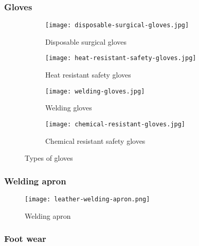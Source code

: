 \documentclass[a4paper,12pt]{article}
\begin{document}
					\subsubsection*{Gloves}
						\begin{figure}[H]
							\begin{subfigure}{.5\textwidth}	
								\centering								
								\texttt{[image: disposable-surgical-gloves.jpg]}
							\caption{Disposable surgical gloves}
							\label{subfig:disposable-surgical-gloves}
							\end{subfigure}
							\hfill
							\begin{subfigure}{.5\textwidth}
								\centering		
								\texttt{[image: heat-resistant-safety-gloves.jpg]}
							\caption{Heat resistant safety gloves}
							\label{subfig:heat-resistant-safety-gloves}
							\end{subfigure}
							\hfill
							\begin{subfigure}{0.5\textwidth}
							\centering				
								\texttt{[image: welding-gloves.jpg]}
							\caption{Welding gloves}
							\label{subfig:welding-gloves}
							\end{subfigure}
							\hfill
							\begin{subfigure}{0.5\textwidth}
							\centering				
								\texttt{[image: chemical-resistant-gloves.jpg]}
							\caption{Chemical resistant safety gloves}
							\label{subfig:chemical-resistant-safety-gloves}
							\end{subfigure}
							\caption{Types of gloves}
							\label{fig:types-of-gloves}
						\end{figure}
						
					\subsubsection*{Welding apron}
					
						\begin{figure}[H]
							\centering
							\texttt{[image: leather-welding-apron.png]}
							\caption{Welding apron}
							\label{fig:welding-apron}
						\end{figure}
					
					\newpage
					\subsubsection*{Foot wear}
						
\end{document}
